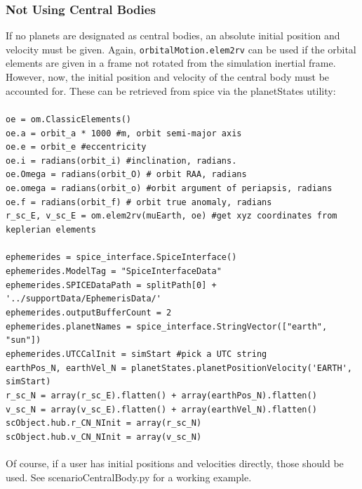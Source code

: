 \subsubsection{Not Using Central Bodies}
If no planets are designated as central bodies, an absolute initial position and velocity must be given. Again, \verb|orbitalMotion.elem2rv| can be used if the orbital elements are given in a frame not rotated from the simulation inertial frame. However, now, the initial position and velocity of the central body must be accounted for. These can be retrieved from spice via the planetStates utility:\\\\
\verb|oe = om.ClassicElements()|\\
\verb|oe.a = orbit_a * 1000 #m, orbit semi-major axis|\\
\verb|oe.e = orbit_e #eccentricity|\\
\verb|oe.i = radians(orbit_i) #inclination, radians.|\\
\verb|oe.Omega = radians(orbit_O) # orbit RAA, radians|\\
\verb|oe.omega = radians(orbit_o) #orbit argument of periapsis, radians|\\
\verb|oe.f = radians(orbit_f) # orbit true anomaly, radians|\\
\verb|r_sc_E, v_sc_E = om.elem2rv(muEarth, oe) #get xyz coordinates from keplerian elements|\\\\
\verb|ephemerides = spice_interface.SpiceInterface()|\\
\verb|ephemerides.ModelTag = "SpiceInterfaceData"|\\
\verb|ephemerides.SPICEDataPath = splitPath[0] + '../supportData/EphemerisData/'|\\
\verb|ephemerides.outputBufferCount = 2|\\
\verb|ephemerides.planetNames = spice_interface.StringVector(["earth", "sun"])|\\
\verb|ephemerides.UTCCalInit = simStart #pick a UTC string|\\
\verb|earthPos_N, earthVel_N = planetStates.planetPositionVelocity('EARTH', simStart)|\\
\verb|r_sc_N = array(r_sc_E).flatten() + array(earthPos_N).flatten()|\\
\verb|v_sc_N = array(v_sc_E).flatten() + array(earthVel_N).flatten()|\\
\verb|scObject.hub.r_CN_NInit = array(r_sc_N)|\\
\verb|scObject.hub.v_CN_NInit = array(v_sc_N)|\\\\
Of course, if a user has initial positions and velocities directly, those should be used. See scenarioCentralBody.py for a working example.\\

